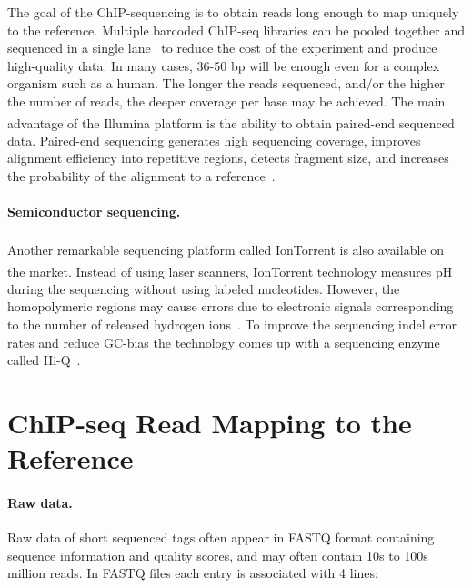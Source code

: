 The goal of the ChIP-sequencing is to obtain reads long enough to map uniquely to the reference. 
Multiple barcoded ChIP-seq libraries can be pooled together and sequenced in a single lane~\cite{craig2008identification} to reduce the cost of the experiment and produce high-quality data.
In many cases, 36-50 bp will be enough even for a complex organism such as a human. 
The longer the reads sequenced, and/or the higher the number of reads, the deeper coverage per base may be achieved.
The main advantage of the Illumina\textsuperscript{\texttrademark} platform is the ability to obtain paired-end sequenced data. 
Paired-end sequencing generates high sequencing coverage, improves alignment efficiency into repetitive regions, detects fragment size, and increases the probability of the alignment to a reference~\cite{kidder2011chip, chen2012systematic}.



\paragraph{Semiconductor sequencing.}
Another remarkable sequencing platform called IonTorrent\textsuperscript{\texttrademark} is also available on the market. 
Instead of using laser scanners, IonTorrent\textsuperscript{\texttrademark} technology measures pH during the sequencing without using labeled nucleotides. 
However, the homopolymeric regions may cause errors due to electronic signals corresponding to the number of released hydrogen ions~\cite{ambardar2016high}.
To improve the sequencing indel error rates and reduce GC-bias the technology comes up with a sequencing enzyme called Hi-Q~\cite{veras2014efficiency}. 










\section{ChIP-seq Read Mapping to the Reference}

\paragraph{Raw data.}
Raw data of short sequenced tags often appear in FASTQ format containing sequence information and quality scores, and may often contain 10s to 100s million reads.
In FASTQ files each entry is associated with 4 lines:


